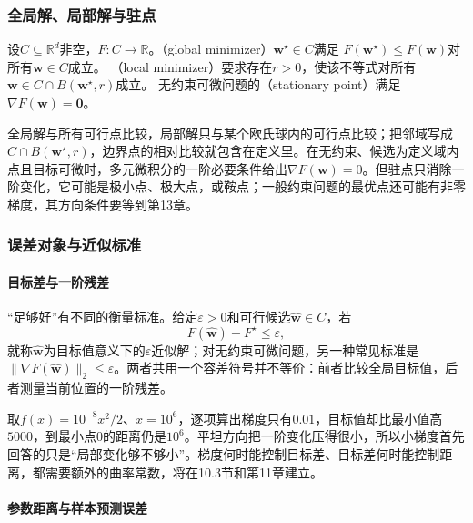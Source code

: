 \subsubsection{全局解、局部解与驻点}

\begin{definition}
\label{def:opt-solutions-stationarity}
设$C\subseteq\mathbb R^d$非空，$F:C\to\mathbb R$。（global minimizer）$\bm{w}^{\star}\in C$满足
$F(\bm{w}^{\star})\leq F(\bm{w})$对所有$\bm{w}\in C$成立。
（local minimizer）要求存在$r>0$，使该不等式对所有
$\bm w\in C\cap B(\bm w^\star,r)$成立。
无约束可微问题的（stationary point）满足
$\nabla F(\bm{w})=\bm{0}$。
\end{definition}

全局解与所有可行点比较，局部解只与某个欧氏球内的可行点比较；把邻域写成$C\cap B(\bm w^\star,r)$，边界点的相对比较就包含在定义里。在无约束、候选为定义域内点且目标可微时，多元微积分的一阶必要条件给出$\nabla F(\bm w)=0$。但驻点只消除一阶变化，它可能是极小点、极大点，或鞍点；一般约束问题的最优点还可能有非零梯度，其方向条件要等到第13章。

\subsubsection{误差对象与近似标准}

\paragraph{目标差与一阶残差}

“足够好”有不同的衡量标准。给定$\varepsilon>0$和可行候选$\widehat{\bm w}\in C$，若
\[
  F(\widehat{\bm{w}})-F^\star\leq\varepsilon,
\]
就称$\widehat{\bm w}$为目标值意义下的$\varepsilon$近似解；对无约束可微问题，另一种常见标准是$\lVert\nabla F(\widehat{\bm{w}})\rVert_2\leq\varepsilon$。两者共用一个容差符号并不等价：前者比较全局目标值，后者测量当前位置的一阶残差。

取$f(x)=10^{-8}x^2/2$、$x=10^6$，逐项算出梯度只有$0.01$，目标值却比最小值高$5000$，到最小点$0$的距离仍是$10^6$。平坦方向把一阶变化压得很小，所以小梯度首先回答的只是“局部变化够不够小”。梯度何时能控制目标差、目标差何时能控制距离，都需要额外的曲率常数，将在10.3节和第11章建立。

\paragraph{参数距离与样本预测误差}

